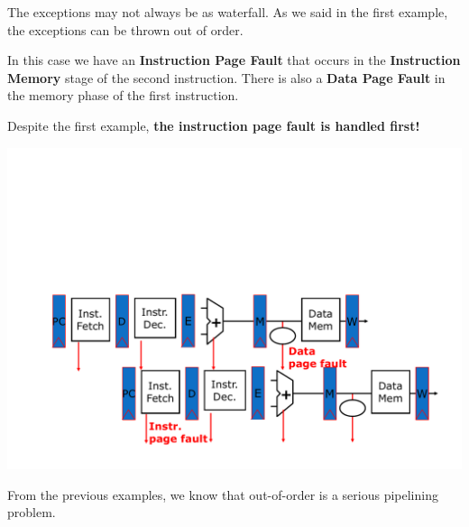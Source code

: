\begin{examplebox}
    The exceptions may not always be as waterfall. As we said in the first example, the exceptions can be thrown out of order.

    \highspace
    In this case we have an \textbf{Instruction Page Fault} that occurs in the \textbf{Instruction Memory} stage of the second instruction. There is also a \textbf{Data Page Fault} in the memory phase of the first instruction.

    Despite the first example, \textbf{the instruction page fault is handled first!}

    \begin{center}
        \includegraphics[width=\textwidth]{img/exceptions-in-the-5-stage-pipeline-3.pdf}
    \end{center}
\end{examplebox}

\noindent
From the previous examples, we know that out-of-order is a serious pipelining problem.

